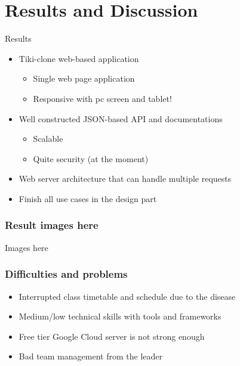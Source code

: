 \documentclass{beamer}
\begin{document}
\section{Results and Discussion}

\begin{frame}{Results}
	\begin{itemize}
    	\item Tiki-clone web-based application
    	\begin{itemize}
    	    \item Single web page application
    	    \item Responsive with pc screen and tablet!
    	\end{itemize}
    	\item Well constructed JSON-based API and documentations
    	\begin{itemize}
    	    \item Scalable
    	    \item Quite security (at the moment)
    	\end{itemize}
        \item Web server architecture that can handle multiple requests
        \item Finish all use cases in the design part
	\end{itemize}
\end{frame}

\begin{frame}[fragile]
\frametitle{Result images here}
    Images here
\end{frame} 
    
\begin{frame}[fragile]
\frametitle{Difficulties and problems}
    \begin{itemize}
    	\item Interrupted class timetable and schedule due to the disease
    	\item Medium/low technical skills with tools and frameworks
        \item Free tier Google Cloud server is not strong enough
        \item Bad team management from the leader
	\end{itemize}
\end{frame}    
\end{document}
